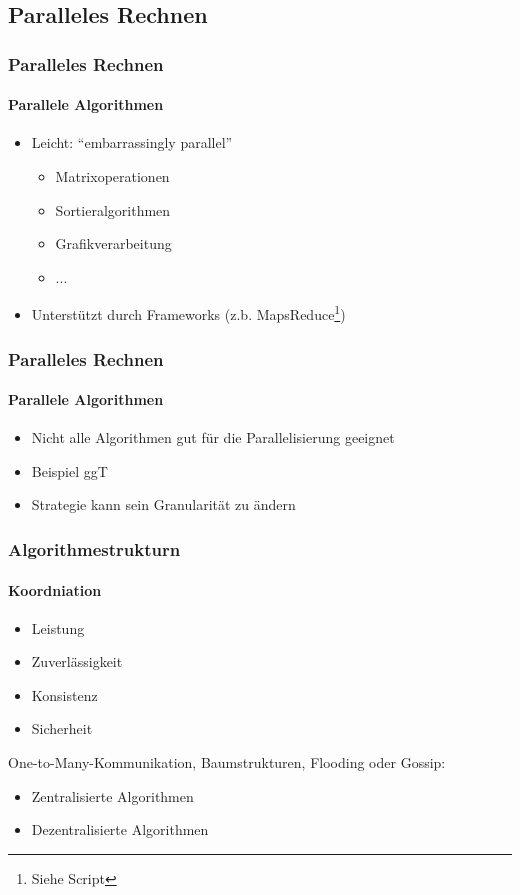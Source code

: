 \subsection{Paralleles Rechnen}
\begin{frame}
  \frametitle{Paralleles Rechnen}
  \framesubtitle{Parallele Algorithmen}
  \begin{itemize}
    \item Leicht: \enquote{embarrassingly parallel} 
    \begin{itemize}
      \item Matrixoperationen
      \item Sortieralgorithmen
      \item Grafikverarbeitung
      \item ...
    \end{itemize}
    \item Unterstützt durch Frameworks (z.b. MapsReduce\footnote{Siehe Script})
  \end{itemize}
\end{frame}


\begin{frame}
  \frametitle{Paralleles Rechnen}
  \framesubtitle{Parallele Algorithmen}
  \begin{itemize}
    \item Nicht alle Algorithmen gut für die Parallelisierung geeignet
    \item Beispiel ggT
    \item Strategie kann sein Granularität zu ändern
  \end{itemize}
\end{frame}

\begin{frame}
  \frametitle{Algorithmestrukturn}
  \framesubtitle{Koordniation}
  \begin{itemize}
      \item Leistung
      \item Zuverlässigkeit
      \item Konsistenz
      \item Sicherheit
  \end{itemize}
  One-to-Many-Kommunikation, Baumstrukturen, Flooding oder Gossip: 
  \begin{itemize}
    \item Zentralisierte Algorithmen 
    \item Dezentralisierte Algorithmen
  \end{itemize}
\end{frame}